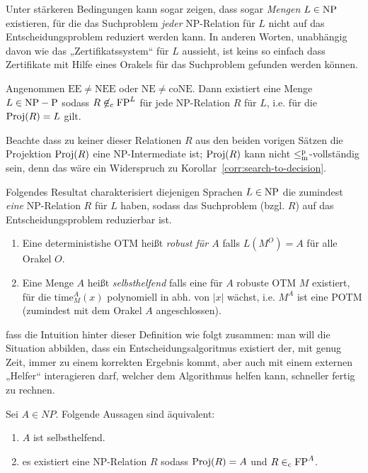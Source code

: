 Unter stärkeren Bedingungen kann sogar zeigen, dass sogar \emph{Mengen} $L\in\mathrm{NP}$ existieren, für die das Suchproblem \emph{jeder} NP-Relation für $L$ nicht auf das Entscheidungsproblem reduziert werden kann. In anderen Worten, unabhängig davon wie das „Zertifikatssystem“ für $L$ aussieht, ist keins so einfach dass Zertifikate mit Hilfe eines Orakels für das Suchproblem gefunden werden können.

\begin{theorem}
Angenommen $\mathrm{EE\neq NEE}$ oder $\mathrm{NE\neq coNE}$. Dann existiert eine Menge $L\in\mathrm{NP}-\mathrm{P}$ sodass $R\not\in_\mathrm{c} \mathrm{FP}^L$ für jede NP-Relation $R$ für $L$, i.e. für die $\operatorname{Proj}(R)=L$ gilt.
\end{theorem}
Beachte dass zu keiner dieser Relationen $R$ aus den beiden vorigen Sätzen die Projektion $\operatorname{Proj}(R)$ eine NP-Intermediate ist; $\operatorname{Proj}(R)$ kann nicht $\leq_\mathrm{m}^\mathrm{p}$-vollständig sein, denn das wäre ein Widerspruch zu Korollar~\ref{corr:search-to-decision}.

Folgendes Resultat charakterisiert diejenigen Sprachen $L\in\mathrm{NP}$ die zumindest \emph{eine} NP-Relation $R$ für $L$ haben, sodass das Suchproblem (bzgl. $R$) auf das Entscheidungsproblem reduzierbar ist.
\begin{definition}
    \begin{enumerate}
        \item Eine deterministishe OTM heißt \emph{robust für $A$} falls $L(M^O)=A$ für alle Orakel $O$.
        \item Eine Menge $A$ heißt \emph{selbsthelfend} falls eine für $A$ robuste OTM $M$ existiert, für die $\mathrm{time}_M^A(x)$ polynomiell in abh. von $|x|$ wächst, i.e. $M^A$ ist eine POTM (zumindest mit dem Orakel $A$ angeschlossen).\qedhere
    \end{enumerate}
\end{definition}
\citeauthor{balcazar_self_1989} fass die Intuition hinter dieser Definition wie folgt zusammen: man will die Situation abbilden, dass ein Entscheidungsalgoritmus existiert der, mit genug Zeit, immer zu einem korrekten Ergebnis kommt, aber auch mit einem externen „Helfer“ interagieren darf, welcher dem Algorithmus helfen kann, schneller fertig zu rechnen.
\begin{theorem}
    Sei $A\in NP$. Folgende Aussagen sind äquivalent:
    \begin{enumerate}
        \item $A$ ist selbsthelfend.
        \item es existiert eine NP-Relation $R$ sodass $\operatorname{Proj}(R)=A$ und $R\in_\mathrm{c} \mathrm{FP}^{A}$.
    \end{enumerate}
\end{theorem}

